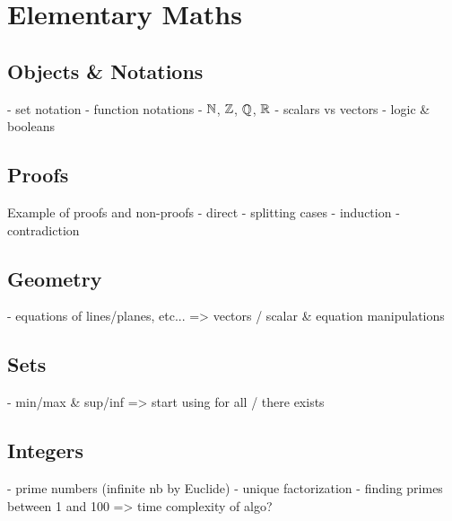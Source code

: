 \section{Elementary Maths}
\subsection{Objects \& Notations}
- set notation
- function notations
- $\mathbb{N}$, $\mathbb{Z}$, $\mathbb{Q}$, $\mathbb{R}$
- scalars vs vectors
- logic \& booleans
\subsection{Proofs}
Example of proofs and non-proofs
- direct
- splitting cases
- induction
- contradiction
\subsection{Geometry}
- equations of lines/planes, etc... => vectors / scalar \& equation manipulations
\subsection{Sets}
- min/max \& sup/inf => start using for all / there exists
\subsection{Integers}
- prime numbers (infinite nb by Euclide)
- unique factorization 
- finding primes between 1 and 100 => time complexity of algo?